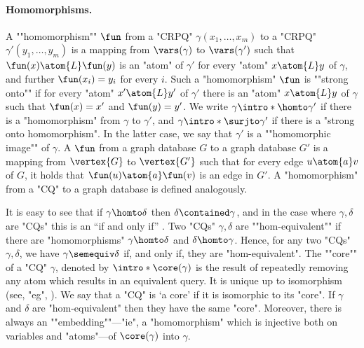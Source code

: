 \paragraph{Homomorphisms.}
\AP A ""homomorphism"" $\fun$ from a "CRPQ" $\gamma(x_1, \dotsc, x_m)$ to a "CRPQ" $\gamma'(y_1, \dotsc, y_m)$ is a mapping from $\vars(\gamma)$ to $\vars(\gamma')$ such that $\fun(x) \atom{L} \fun(y)$ is an "atom" of $\gamma'$ for every "atom" $x \atom{L} y$ of $\gamma$, and further $\fun(x_i)=y_i$ for every $i$.
Such a "homomorphism" $\fun$ is \AP""strong onto"" if for every "atom" $x' \atom{L} y'$ of $\gamma'$ there is an "atom" $x \atom{L} y$ of $\gamma$ such that $\fun(x)=x'$ and $\fun(y)=y'$.
We write $\gamma \intro*\homto \gamma'$ if there is a "homomorphism" from $\gamma$ to $\gamma'$, and $\gamma \intro*\surjto \gamma'$ if there is a "strong onto homomorphism".
In the latter case, we say that $\gamma'$ is a \AP""homomorphic image"" of $\gamma$.
A  $\fun$ from a graph database $G$ to a graph database $G'$ is a mapping from $\vertex{G}$ to $\vertex{G'}$ such that  for every edge $u \atom{a} v$ of $G$, it holds that $\fun(u) \atom{a} \fun(v)$ is an edge in $G'$. A "homomorphism" from a "CQ" to a graph database is defined analogously.  

\AP It is easy to see that if $\gamma \homto \delta$ then $\delta \contained \gamma$, and in the case where $\gamma,\delta$ are "CQs" this is an ``if and only if'' \cite[Lemma 13]{ChandraMerlin1977Implementation}. 
\AP Two "CQs" $\gamma,\delta$ are ""hom-equivalent"" if there are "homomorphisms" $\gamma \homto \delta$ and $\delta \homto \gamma$.
Hence, for any two "CQs" $\gamma, \delta$, we have $\gamma \semequiv \delta$ if, and only if, they are "hom-equivalent".
\AP The ""core"" of a "CQ" $\gamma$, denoted by $\intro*\core(\gamma)$
is the result of repeatedly removing any atom which results in an equivalent query. It is unique up to isomorphism (see, "eg", \cite{ChandraMerlin1977Implementation}). We say that a "CQ" is `a core' if it is isomorphic to its "core". If $\gamma$ and $\delta$ are "hom-equivalent" then they have
the same "core". Moreover, there is always an \AP""embedding""---"ie", a "homomorphism" which is injective both on variables and "atoms"---of $\core(\gamma)$ into $\gamma$.

